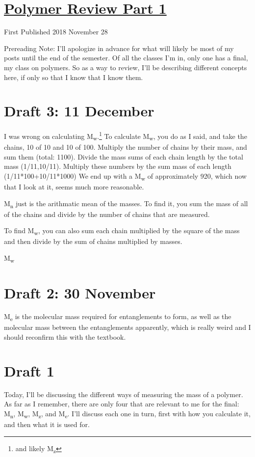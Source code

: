 \documentclass[12pt]{article}[titlepage]
\newcommand{\1}{\={a}}
\newcommand{\2}{\={e}}
\newcommand{\3}{\={\i}}
\newcommand{\4}{\=o}
\newcommand{\5}{\=u}
\newcommand{\6}{\={A}}
\newcommand{\sub}[1]{\textsubscript{#1}}
\renewcommand{\,}{\textsuperscript{,}}
\begin{document}
\doublespacing
\section{\href{polymer-1.html}{Polymer Review Part 1}}
First Published 2018 November 28

Prereading Note: I'll apologize in advance for what will likely be most of my posts until the end of the semester.
Of all the classes I'm in, only one has a final, my class on polymers.
So as a way to review, I'll be describing different concepts here, if only so that I know that I know them.
\section{Draft 3: 11 December}
I was wrong on calculating M\sub{w}.\footnote{and likely M\sub{z}}
To calculate M\sub{w}, you do as I said, and take the chains, 10 of 10 and 10 of 100.
Multiply the number of chains by their mass, and sum them (total: 1100).
Divide the mass sums of each chain length by the total mass (1/11,10/11).
Multiply these numbers by the sum mass of each length (1/11*100+10/11*1000)
We end up with a M\sub{w} of approximately 920, which now that I look at it, seems much more reasonable.

M\sub{n} just is the arithmatic mean of the masses.
To find it, you sum the mass of all of the chains and divide by the number of chains that are measured.

To find M\sub{w}, you can also sum each chain multiplied by the square of the mass and then divide by the sum of chains multiplied by masses.

M\sub{w} 
\section{Draft 2: 30 November}
M\sub{e} is the molecular mass required for entanglements to form, as well as the molecular mass between the entanglements apparently, which is really weird and I should reconfirm this with the textbook.
\section{Draft 1}
Today, I'll be discussing the different ways of measuring the mass of a polymer.
As far as I remember, there are only four that are relevant to me for the final: M\sub{n}, M\sub{w}, M\sub{z}, and M\sub{e}.
I'll discuss each one in turn, first with how you calculate it, and then what it is used for.
\end{document}
